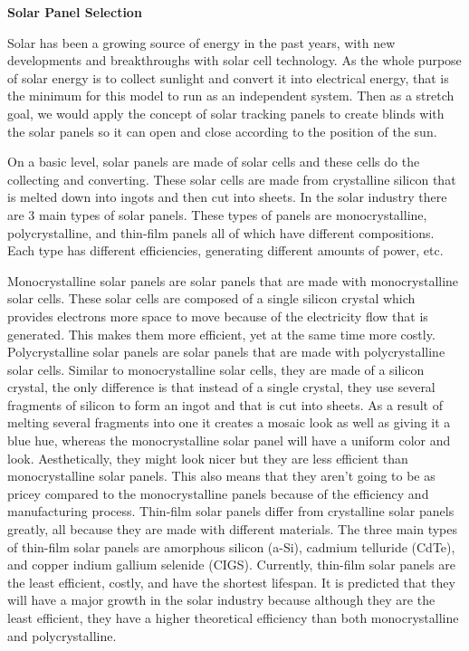 \textbf{Solar Panel Selection}\par
Solar has been a growing source of energy in the past years, with new developments and breakthroughs with solar cell technology. As the whole purpose of solar energy is to collect sunlight and convert it into electrical energy, that is the minimum for this model to run as an independent system. Then as a stretch goal, we would apply the concept of solar tracking panels to create blinds with the solar panels so it can open and close according to the position of the sun.\par
On a basic level, solar panels are made of solar cells and these cells do the collecting and converting. These solar cells are made from crystalline silicon that is melted down into ingots and then cut into sheets. In the solar industry there are 3 main types of solar panels. These types of panels are monocrystalline, polycrystalline, and thin-film panels all of which have different compositions. Each type has different efficiencies, generating different amounts of power, etc.\par
Monocrystalline solar panels are solar panels that are made with monocrystalline solar cells. These solar cells are composed of a single silicon crystal which provides electrons more space to move because of the electricity flow that is generated. This makes them more efficient, yet at the same time more costly. Polycrystalline solar panels are solar panels that are made with polycrystalline solar cells. Similar to monocrystalline solar cells, they are made of a silicon crystal, the only difference is that instead of a single crystal, they use several fragments of silicon to form an ingot and that is cut into sheets. As a result of melting several fragments into one it creates a mosaic look as well as giving it a blue hue, whereas the monocrystalline solar panel will have a uniform color and look. Aesthetically, they might look nicer but they are less efficient than monocrystalline solar panels. This also means that they aren’t going to be as pricey compared to the monocrystalline panels because of the efficiency and manufacturing process. Thin-film solar panels differ from crystalline solar panels greatly, all because they are made with different materials. The three main types of thin-film solar panels are amorphous silicon (a-Si), cadmium telluride (CdTe), and copper indium gallium selenide (CIGS). Currently, thin-film solar panels are the least efficient, costly, and have the shortest lifespan. It is predicted that they will have a major growth in the solar industry because although they are the least efficient, they have a higher theoretical efficiency than both monocrystalline and polycrystalline. \par
